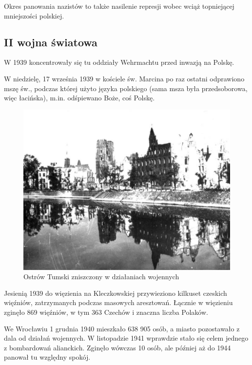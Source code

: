 \documentclass{article}
\begin{document}
Okres panowania nazistów to także nasilenie represji wobec wciąż topniejącej mniejszości polskiej.

\subsection{II wojna światowa}
W 1939 koncentrowały się tu oddziały Wehrmachtu przed inwazją na Polskę.

W niedzielę, 17 września 1939 w kościele św. Marcina po raz ostatni odprawiono mszę św., podczas której użyto języka polskiego (sama msza była przedsoborowa, więc łacińska), m.in. odśpiewano Boże, coś Polskę.

 \begin{figure}[h!]
\centering
\includegraphics[scale=0.4]{13.png}
\caption{Ostrów Tumski zniszczony w działaniach wojennych}
\end{figure}
Jesienią 1939 do więzienia na Kleczkowskiej przywieziono kilkuset czeskich więźniów, zatrzymanych podczas masowych aresztowań. Łącznie w więzieniu zginęło 869 więźniów, w tym 363 Czechów i znaczna liczba Polaków.

We Wrocławiu 1 grudnia 1940 mieszkało 638 905 osób, a miasto pozostawało z dala od działań wojennych. W listopadzie 1941 wprawdzie stało się celem jednego z bombardowań alianckich. Zginęło wówczas 10 osób, ale później aż do 1944 panował tu względny spokój.
\end{document}
